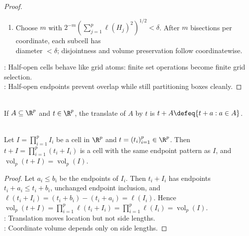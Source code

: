 \begin{proposition}
\begin{proof}
\begin{enumerate}[label=(\roman*)]
\item Choose $m$ with $2^{-m}(\sum_{j=1}^{p}\ell(H_j)^2)^{1/2}<\delta$. After $m$ bisections per coordinate, each subcell has\\
diameter $<\delta$; disjointness and volume preservation follow coordinatewise.
\end{enumerate}
: Half-open cells behave like grid atoms: finite set operations become finite grid selection.\\
: Half-open endpoints prevent overlap while still partitioning boxes cleanly.
\end{proof}
\end{proposition}

\begin{definition} \label{def:translation-of-euclidean-set} \\
If $A\subseteq\R^p$ and $t\in\R^p$, the translate of $A$ by $t$ is $t+A\defeq\{t+a:a\in A\}$.
\end{definition}

\begin{proposition} \label{prop:cell-volume-translation-invariant} \\
Let $I=\prod_{i=1}^{p}I_i$ be a cell in $\R^p$ and $t=(t_i)_{i=1}^{p}\in\R^p$. Then $t+I=\prod_{i=1}^{p}(t_i+I_i)$ is a cell with the same endpoint pattern as $I$, and $\operatorname{vol}_p(t+I)=\operatorname{vol}_p(I)$.
\begin{proof}
Let $a_i\leq b_i$ be the endpoints of $I_i$. Then $t_i+I_i$ has endpoints $t_i+a_i\leq t_i+b_i$, unchanged endpoint inclusion, and $\ell(t_i+I_i)=(t_i+b_i)-(t_i+a_i)=\ell(I_i)$. Hence $\operatorname{vol}_p(t+I)=\prod_{i=1}^{p}\ell(t_i+I_i)=\prod_{i=1}^{p}\ell(I_i)=\operatorname{vol}_p(I)$.\\
: Translation moves location but not side lengths.\\
: Coordinate volume depends only on side lengths.
\end{proof}
\end{proposition}

